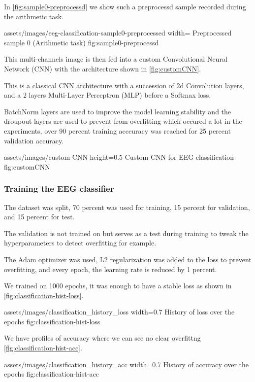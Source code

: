In \cref{fig:sample0-preprocessd} we show such a preprocessd sample recorded
during the arithmetic task.

\insertfigure
    {assets/images/eeg-classification-sample0-preprocessed}
    {width=\textwidth}
    {Preprocessed sample 0 (Arithmetic task)}
    {fig:sample0-preprocessd}

This multi-channels image is then fed into a custom Convolutional Neural Network
(CNN) with the architecture shown in \cref{fig:customCNN}.

This is a classical CNN architecture with a succession of 2d Convolution layers,
and a 2 layers Multi-Layer Perceptron (MLP) before a Softmax loss.

BatchNorm layers are used to improve the model learning stability and the
droupout layers are used to prevent from overfitting which occured a lot in the
experiments, over 90 percent training acccuracy was reached for 25 percent
validation accuracy.

\insertfigure
    {assets/images/custom-CNN}
    {height=0.5\textheight}
    {Custom CNN for EEG classification}
    {fig:customCNN}

\subsubsection{Training the EEG classifier}

The dataset was split, 70 percent was used for training, 15 percent for
validation, and 15 percent for test.

The validation is not trained on but serves as a test during training to tweak
the hyperparameters to detect overfitting for example.

The Adam optimizer was used, L2 regularization was added to the loss to prevent
overfitting, and every epoch, the learning rate is reduced by 1 percent.

We trained on 1000 epochs, it was enough to have a stable loss as shown in
\cref{fig:classification-hist-loss}.

\insertfigure
    {assets/images/classification_history_loss}
    {width=0.7\textwidth}
    {History of loss over the epochs}
    {fig:classification-hist-loss}

We have profiles of accuracy where we can see no clear overfittng
\cref{fig:classification-hist-acc}.

\insertfigure
    {assets/images/classification_history_acc}
    {width=0.7\textwidth}
    {History of accuracy over the epochs}
    {fig:classification-hist-acc}

